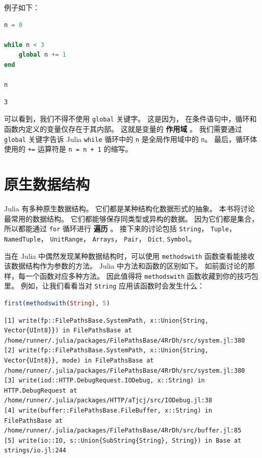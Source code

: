 \documentclass[
  notoc %
]{tufte-book}
\newcommand{\passthrough}[1]{#1}
\begin{document}
例子如下：

\begin{lstlisting}[language=Julia]
n = 0

while n < 3
    global n += 1
end

n
\end{lstlisting}

\begin{lstlisting}[language=Output]
3
\end{lstlisting}

可以看到，我们不得不使用 \passthrough{\lstinline!global!} 关键字。
这是因为， 在条件语句中，循环和函数内定义的变量仅存在于其内部。
这就是变量的 \textbf{作用域} 。 我们需要通过
\passthrough{\lstinline!global!} 关键字告诉 Julia
\passthrough{\lstinline!while!} 循环中的 \passthrough{\lstinline!n!}
是全局作用域中的 \passthrough{\lstinline!n!}。 最后，循环体使用的
\passthrough{\lstinline!+=!} 运算符是
\passthrough{\lstinline!n = n + 1!} 的缩写。

\hypertarget{sec:data_structures}{%
\section{原生数据结构}\label{sec:data_structures}}

Julia 有多种原生数据结构。 它们都是某种结构化数据形式的抽象。
本书将讨论最常用的数据结构。 它们都能够保存同类型或异构的数据。
因为它们都是集合， 所以都能通过 \passthrough{\lstinline!for!} 循环进行
\textbf{遍历} 。 接下来的讨论包括 \passthrough{\lstinline!String!}，
\passthrough{\lstinline!Tuple!}， \passthrough{\lstinline!NamedTuple!}，
\passthrough{\lstinline!UnitRange!}， \passthrough{\lstinline!Arrays!}，
\passthrough{\lstinline!Pair!}， \passthrough{\lstinline!Dict!},
\passthrough{\lstinline!Symbol!}。

当在 Julia 中偶然发现某种数据结构时，可以使用
\passthrough{\lstinline!methodswith!}
函数查看能接收该数据结构作为参数的方法。 Julia 中方法和函数的区别如下。
如前面讨论的那样，每一个函数对应多种方法。 因此值得将
\passthrough{\lstinline!methodswith!} 函数收藏到你的技巧包里。
例如，让我们看看当对 \passthrough{\lstinline!String!}
应用该函数时会发生什么：

\begin{lstlisting}[language=Julia]
first(methodswith(String), 5)
\end{lstlisting}

\begin{lstlisting}[language=Output]
[1] write(fp::FilePathsBase.SystemPath, x::Union{String, Vector{UInt8}}) in FilePathsBase at /home/runner/.julia/packages/FilePathsBase/4RrDh/src/system.jl:380
[2] write(fp::FilePathsBase.SystemPath, x::Union{String, Vector{UInt8}}, mode) in FilePathsBase at /home/runner/.julia/packages/FilePathsBase/4RrDh/src/system.jl:380
[3] write(iod::HTTP.DebugRequest.IODebug, x::String) in HTTP.DebugRequest at /home/runner/.julia/packages/HTTP/aTjcj/src/IODebug.jl:38
[4] write(buffer::FilePathsBase.FileBuffer, x::String) in FilePathsBase at /home/runner/.julia/packages/FilePathsBase/4RrDh/src/buffer.jl:85
[5] write(io::IO, s::Union{SubString{String}, String}) in Base at strings/io.jl:244
\end{lstlisting}
\end{document}
